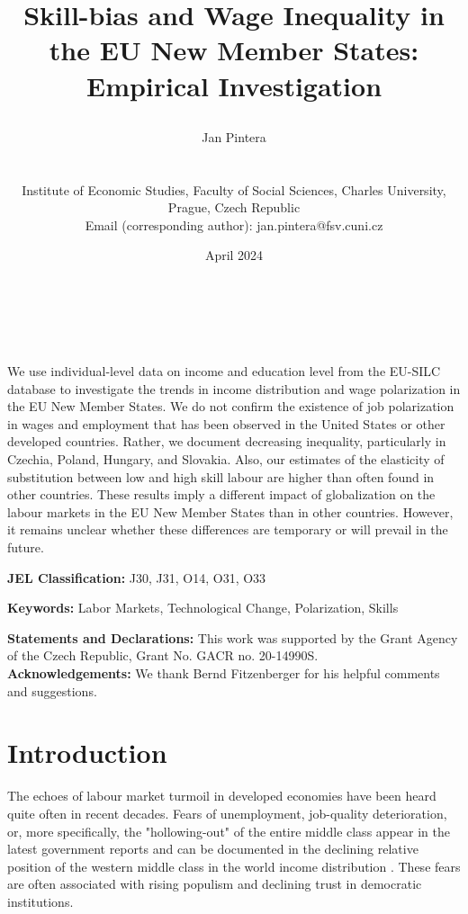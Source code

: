 \documentclass[11pt]{article}
\title{\begin{LARGE}Skill-bias and Wage Inequality in the EU New Member States: Empirical Investigation\end{LARGE}}
\author{    
    \begin{large}Jan Pintera\end{large} \\\vspace{5mm} \begin{small} Institute of Economic Studies, Faculty of Social Sciences, Charles University,\\ Prague, Czech Republic\\
    Email (corresponding author): jan.pintera@fsv.cuni.cz \end{small}
}
\date{April 2024}
\makeatletter
\renewcommand{\maketitle}{\bgroup\setlength{\parindent}{0pt}
\begin{flushright}
  \textbf{\@title}\\
  \vspace{5mm}
  \@author\\
  \vspace{5mm}
  \@date
\end{flushright}\egroup
}
\renewenvironment{abstract}
 {\small
  \begin{flushleft}
  \bfseries \abstractname\vspace{-.5em}\vspace{0pt}
  \end{flushleft}
  \list{}{%
    \setlength{\leftmargin}{0mm}%
    \setlength{\rightmargin}{\leftmargin}%
  }%
  \item\relax}
 {\endlist}
\def \jel {	J30, J31, O14, O31, O33}
\def \Keywords {Labor Markets, Technological Change, Polarization, Skills}
\makeatother
\begin{document}
\maketitle

\thispagestyle{empty}
\begin{abstract}
We use individual-level data on income and education level from the EU-SILC database to investigate the trends in income distribution and wage polarization in the EU New Member States. We do not confirm the existence of job polarization in wages and employment that has been observed in the United States or other developed countries. Rather, we document decreasing inequality, particularly in Czechia, Poland, Hungary, and Slovakia. Also, our estimates of the elasticity of substitution between low and 
high skill labour are higher than often found in other countries. These results imply a different impact of globalization on the labour markets in the EU New Member States than in other countries. However, it remains unclear whether these differences are temporary or will prevail in the future.
\bigskip

\textbf{JEL Classification:} \jel

\textbf{Keywords:}  \Keywords

\bigskip
\textbf{Statements and Declarations:}
This work was supported by the Grant Agency of the Czech Republic, Grant No. GACR no. 20-14990S.
\\

\textbf{Acknowledgements:}
We thank Bernd Fitzenberger for his helpful comments and suggestions.

\end{abstract}
\clearpage
\setcounter{page}{1}



\section{Introduction}
The echoes of labour market turmoil in developed economies have been heard quite often in recent decades. Fears of unemployment, job-quality deterioration, or, more specifically, the "hollowing-out" of the entire middle class appear in the latest government reports \citetext{e.g., \citealt{rodrik2020economic}} and can be documented in the declining relative position of the western middle class in the world income distribution \citep{milanovic2020elephant}. These fears are often associated with rising populism and declining trust in democratic institutions.
\end{document}
